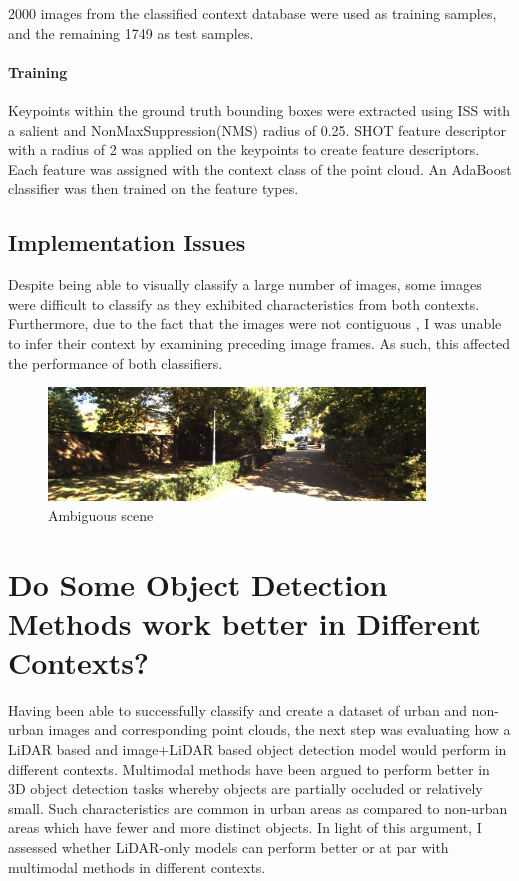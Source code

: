 2000 images from the classified context database were used as training samples, and the remaining 1749 as test samples.
\paragraph{Training}Keypoints within the ground truth bounding boxes were extracted using  ISS with a salient and NonMaxSuppression(NMS) radius of 0.25. SHOT feature descriptor with a radius of 2 was applied on the keypoints to create feature descriptors. Each feature was assigned with the context class of the point cloud. An AdaBoost classifier was then trained on the feature types. 
\subsection{Implementation Issues} 

Despite being able to visually classify a large number of images, some images were difficult to classify as they exhibited characteristics from both contexts. Furthermore, due to the fact that the images were not contiguous , I was unable to infer their context by examining preceding image frames. As such, this affected the performance of both classifiers. 
\begin{figure}[H]%
	\centering
	\includegraphics[width=10cm]{images/ambiguous.png}%
	\caption{Ambiguous scene}%
	\label{fig:ambiguous}%
\end{figure}

\section{ Do Some Object Detection Methods work better in Different Contexts?}

Having been able to successfully classify and create a dataset of urban and non-urban images and corresponding point clouds, the next step was evaluating how a LiDAR based and image+LiDAR based object detection model would perform in different contexts. Multimodal methods have been argued to perform better in 3D object detection tasks whereby objects are partially occluded or relatively small. Such characteristics are common in urban areas as compared to non-urban areas which have fewer and more distinct objects. In light of this argument, I assessed whether LiDAR-only models can perform better or at par with multimodal methods in different contexts. 

